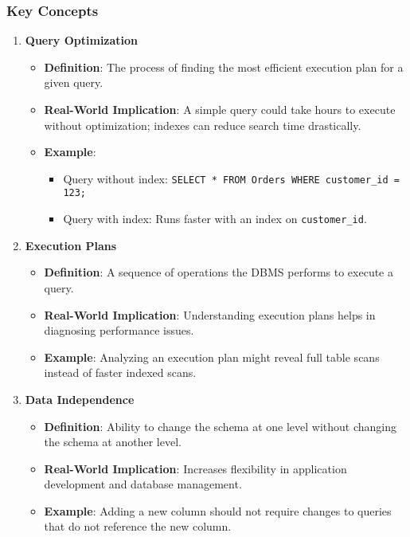 \documentclass[aspectratio=169]{beamer}
\begin{document}
\begin{frame}[fragile]
    \frametitle{Key Concepts}
    \begin{enumerate}
        \item \textbf{Query Optimization}
            \begin{itemize}
                \item \textbf{Definition}: The process of finding the most efficient execution plan for a given query.
                \item \textbf{Real-World Implication}: A simple query could take hours to execute without optimization; indexes can reduce search time drastically.
                \item \textbf{Example}: 
                    \begin{itemize}
                        \item Query without index: \texttt{SELECT * FROM Orders WHERE customer\_id = 123;}
                        \item Query with index: Runs faster with an index on \texttt{customer\_id}.
                    \end{itemize}
            \end{itemize}
        
        \item \textbf{Execution Plans}
            \begin{itemize}
                \item \textbf{Definition}: A sequence of operations the DBMS performs to execute a query.
                \item \textbf{Real-World Implication}: Understanding execution plans helps in diagnosing performance issues.
                \item \textbf{Example}: Analyzing an execution plan might reveal full table scans instead of faster indexed scans.
            \end{itemize}
        
        \item \textbf{Data Independence}
            \begin{itemize}
                \item \textbf{Definition}: Ability to change the schema at one level without changing the schema at another level.
                \item \textbf{Real-World Implication}: Increases flexibility in application development and database management.
                \item \textbf{Example}: Adding a new column should not require changes to queries that do not reference the new column.
            \end{itemize}
    \end{enumerate}
\end{frame}
\end{document}
